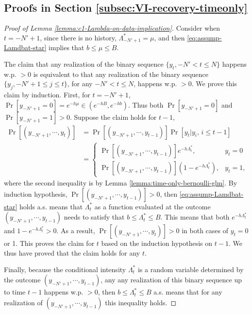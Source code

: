 \documentclass[11pt]{article}
\theoremstyle{remark}
\theoremstyle{plain}
\begin{document}
\subsection{Proofs in Section \ref{subsec:VI-recovery-timeonly}}
%
\begin{proof}[Proof of Lemma \ref{lemma:c1-Lambda-on-data-implication}]
Consider when $t= -N'+1$, since there is no history, $\Lambda_{-N'+1}^* = \mu$, and then  \eqref{eq:assump-Lamdbat-star} implies that $ b \le \mu \le B$.


The claim that any realization of the binary sequence $\{y_t, -N' <  t \le N\}$ happens w.p. $> 0$ is equivalent to that 
any realization of the binary sequence
$\{y_j, -N'+1 \le j \le t\}$, for any $ -N' < t \le N$, happens w.p. $> 0$.
We prove this claim by induction. 
%
First, for $t= -N'+1$, $\Pr [ y_{-N'+1}  =0] = e^{-h \mu} \in (e^{-hB}, e^{-hb})$. Thus both $\Pr [ y_{-N'+1}  =0]$ and $\Pr [ y_{-N'+1}  =1] >0$. 
%
Suppose the claim holds for $t-1$, 
\begin{align*}
\Pr [ (y_{ -N'+1 }, \cdots, y_{t}) ]
& = \Pr [ (y_{ -N'+1 }, \cdots, y_{t-1}) ] \Pr [ y_t | y_i, \,  i \le t-1 ] \\
& = \begin{cases}
\Pr [ (y_{ -N'+1 }, \cdots, y_{t-1}) ] e^{-h \Lambda_t^*}, & y_t =0 \\
\Pr [ (y_{ -N'+1 }, \cdots, y_{t-1}) ] (1-e^{-h \Lambda_t^*}), &  y_t =1,
\end{cases}
\end{align*}
where the second inequality is by Lemma \ref{lemma:time-only-bernoulli-glm}.
By induction hypothesis, $\Pr [ (y_{ -N'+1 }, \cdots, y_{t-1}) ]  > 0 $, 
then \eqref{eq:assump-Lamdbat-star} holds a.s. means that 
$ \Lambda_t^*$ as a function evaluated at the outcome $(y_{ -N'+1 }, \cdots, y_{t-1})$ needs to satisfy that $ b \le \Lambda_t^* \le B$. This means that both $e^{-h \Lambda_t^*}$ and $1-e^{-h \Lambda_t^*} > 0$. 
As a result, $\Pr [ (y_{ -N'+1 }, \cdots, y_{t}) ] > 0$ in both cases of $y_t = 0$ or 1. 
This proves the claim for $t$ based on the induction hypothesis on $t-1$.
We thus have proved that the claim holds for any $t$.

Finally, because  the conditional intensity $ \Lambda_t^*$ is a random variable determined by the outcome $(y_{ -N'+1 }, \cdots, y_{t-1})$, any any realization of this binary sequence up to time $t-1$ happens w.p. $>0$, then $ b \le \Lambda_t^* \le B$ a.s. means that for any realization of $(y_{ -N'+1 }, \cdots, y_{t-1})$ this inequality holds. 
\end{proof}
\end{document}
